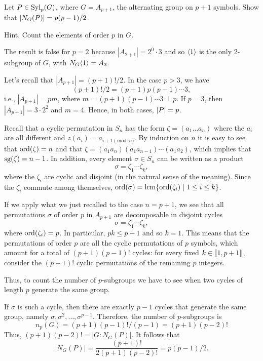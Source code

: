 \begin{probl}\label{problem-1.C.5}
    Let $P\in{\rm Syl}_p(G)$, where $G=A_{p+1}$, the alternating group on $p+1$ symbols. Show that $\left\vert{N_G(P)}\right\vert = p(p-1)/2$.

    \textrm{\rm Hint. Count the elements of order $p$ in $G$.}
\end{probl}

\begin{solution} The result is false for $p=2$ because $|A_{2+1}|=2^0\cdot 3$ and so $\langle1\rangle$ is the only $2$-subgroup of $G$, with $N_G\langle1\rangle=A_3$.

Let's recall that $|A_{p+1}|=(p+1)!/2$. In the case $p>3$, we have
$$
    (p+1)!/2 = (p+1)p(p-1)\cdots3,
$$
i.e., $|A_{p+1}|=pm$, where $m=(p+1)(p-1)\cdots3\perp p$. If $p=3$, then $|A_{p+1}|=3\cdot2^2$ and $m=4$. Hence, in both cases, $\left\vert{P}\right\vert=p$.

Recall that a cyclic permutation in $S_n$ has the form $\zeta=(a_1\dots a_n)$ where the $a_i$ are all different and $z(a_i)=a_{i+1\pmod n}$. By induction on $n$ it is easy to see that ${\rm ord}(\zeta)=n$ and that $\zeta=(a_1 a_n)(a_1 a_{n-1})\cdots(a_1 a_2)$, which implies that $\operatorname{sg}(\zeta)=n-1$. In addition, every element $\sigma\in S_n$ can be written as a product
$$
    \sigma=\zeta_1\cdots\zeta_k,
$$
where the $\zeta_i$ are cyclic and disjoint (in the natural sense of the meaning). Since the $\zeta_i$ commute among themselves, ${\rm ord}(\sigma)=\operatorname{lcm}\{{\rm ord}(\zeta_i)\mid 1\le i\le k\}$.

If we apply what we just recalled to the case $n=p+1$, we see that all permutations $\sigma$ of order $p$ in $A_{p+1}$ are decomposable in disjoint cycles
$$
    \sigma=\zeta_1\cdots\zeta_k,
$$
where ${\rm ord}(\zeta_i)=p$. In particular, $pk\le p+1$ and so $k=1$. This means that the permutations of order $p$ are all the cyclic permutations of $p$ symbols, which amount for a total of $(p+1)(p-1)!$ cycles: for every fixed $k\in\llbracket1,p+1\rrbracket$, consider the $(p-1)!$ cyclic permutations of the remaining $p$ integers.

Thus, to count the number of $p$-subgroups we have to see when two cycles of length $p$ generate the same group.

If $\sigma$ is such a cycle, then there are exactly $p-1$ cycles that generate the same group, namely $\sigma, \sigma^2,\dots,\sigma^{p-1}$. Therefore, the number of $p$-subgroups is 
$$
    n_p(G)=(p+1)(p-1)!/(p-1) = (p+1)(p-2)!
$$
Thus, $(p+1)(p-2)!=|G:N_G(P)|$. It follows that
$$
    |N_G(P)| = \frac{(p+1)!}{2(p+1)(p-2)!}=p(p-1)/2.
$$
 \end{solution}

